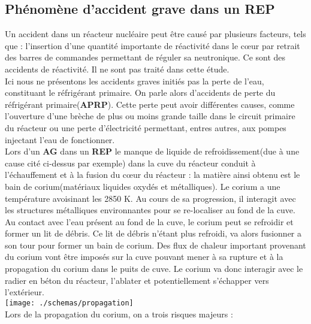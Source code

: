 \documentclass[11pt,a4paper]{scrartcl}%
\begin{document}
	\subsection{Phénomène d'accident grave dans un \textbf{REP}}
	Un accident dans un réacteur nucléaire peut être causé par plusieurs facteurs, tels que : l'insertion d'une quantité importante de réactivité dans le cœur par retrait des barres de commandes permettant de réguler sa neutronique. Ce sont des accidents de réactivité. Il ne sont pas traité dans cette étude. \\
	Ici nous ne présentons les accidents graves initiés pas la perte de l'eau, constituant le réfrigérant primaire. On parle alors d'accidents de perte du réfrigérant primaire(\textbf{APRP}). Cette perte peut avoir différentes causes, comme l'ouverture d'une brèche de plus ou moins grande taille dans le circuit primaire du réacteur ou une perte d'électricité permettant, entres autres, aux pompes injectant l'eau de fonctionner.\\
	Lors d'un \textbf{AG} dans un \textbf{REP} le manque de liquide de refroidissement(due à une cause cité ci-dessus par exemple) dans la cuve du réacteur conduit à l'échauffement et à la fusion du cœur du réacteur : la matière ainsi obtenu est le bain de corium(matériaux liquides oxydés et métalliques). Le corium a une température avoisinant les 2850 K. Au cours de sa progression, il interagit avec les structures métalliques environnantes pour se re-localiser au fond de la cuve. Au contact avec l'eau présent au fond de la cuve, le corium peut se refroidir et former un lit de débris. Ce lit de débris n'étant plus refroidi, va alors fusionner a son tour pour former un bain de corium. Des flux de chaleur important provenant du corium vont être imposés sur la cuve pouvant mener à sa rupture et à la propagation du corium dans le puits de cuve. Le corium va donc interagir avec le radier en béton du réacteur, l'ablater et potentiellement s'échapper vers l'extérieur.\\
	\texttt{[image: ./schemas/propagation]}\\
	\label{Fig.3}
	Lors de la propagation du corium, on a trois risques majeurs :
\end{document}
